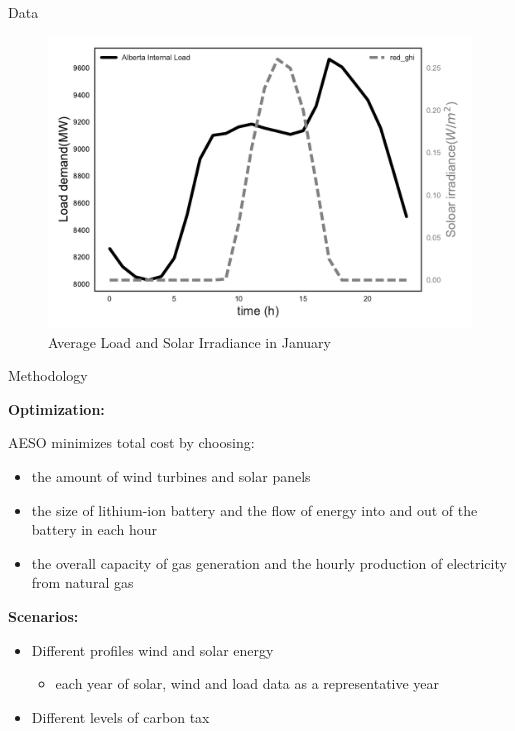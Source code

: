 \documentclass[final]{beamer}
\newlength{\onecolwid}
\newlength{\twocolwid}
\begin{document}
\begin{frame}[t]
\begin{columns}[t]
\begin{column}{\twocolwid}
\begin{columns}[t,totalwidth=\twocolwid]
\begin{column}{\onecolwid}
\begin{block}{Data}
\begin{figure}
	\includegraphics[width=0.8\linewidth]{load_rad}
	\caption{Average Load and Solar Irradiance in January}
\end{figure}


\end{block}






\begin{block}{Methodology}
	
\textbf{Optimization:}


AESO minimizes total cost by choosing: 
	\begin{itemize}
		\item the amount of wind turbines and solar panels
		\item the size of lithium-ion battery and the flow of energy into and out of the battery in each hour
		\item the overall capacity of gas generation and the hourly production of electricity from natural gas
	\end{itemize}
	

	
\textbf{Scenarios:}
	
	\begin{itemize}
		\item Different profiles wind and solar energy
		    \begin{itemize}
		    	\item each year of solar, wind and load data as a representative year 
		    \end{itemize}
		\item Different levels of carbon tax 
		

\end{itemize}
\end{block}
\end{column}
\end{columns}
\end{column}
\end{columns}
\end{frame}
\end{document}
